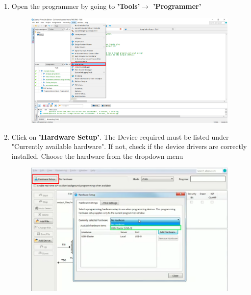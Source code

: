 \documentclass[12pt]{article}
\begin{document}
\begin{enumerate}
     \item Open the programmer by going to \textbf{'Tools'$\rightarrow$ 'Programmer'}
     \begin{figure}[H]
         \centering
         \includegraphics[scale=0.32]{twsd2.png}
     \end{figure}
     \newpage
     \item Click on \textbf{'Hardware Setup'}. The Device required must be listed under "Currently available hardware". If not, check if the device drivers are correctly installed. Choose the hardware from the dropdown menu
     \begin{figure}[H]
         \centering
         \includegraphics[scale=0.4]{downloading to board/3.png}
     \end{figure}
     

\end{enumerate}
\end{document}

